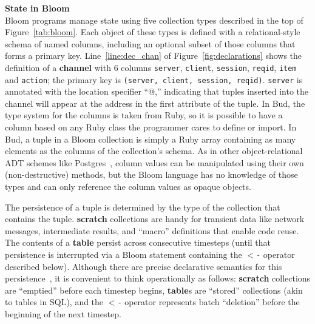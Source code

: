 \vspace{9pt}\noindent\textbf{State in Bloom}\\
Bloom programs manage state using five collection types described in
the top of Figure~\ref{tab:bloom}. Each object of these types is defined with a
relational-style schema of named columns, including an optional subset of those
columns that forms a primary key.  
Line~\ref{line:dec_chan} of
Figure~\ref{fig:declarations} shows the definition of a \textbf{channel} with 6
columns \texttt{server}, \texttt{client}, \texttt{session}, \texttt{reqid}, \texttt{item} and \texttt{action}; the
primary key is \texttt{(server, client, session, reqid)}. \texttt{server} is annotated with the location
specifier ``@,''
indicating that tuples inserted into the channel will appear at the address
in the first attribute of the tuple.
In Bud, the type system for the
columns is taken from Ruby, so it is possible to have a column based on any Ruby
class the programmer cares to define or import.  In Bud, a tuple in a Bloom
collection is simply a Ruby array containing as many elements as the columns of
the collection's schema.  As in other object-relational ADT schemes like
Postgres~\cite{postgres-adt}, column values can be manipulated using their own
(non-destructive) methods, but the Bloom language has no knowledge of those
types and can only reference the column values as opaque objects.

The persistence of a tuple is determined by the type of the collection that
contains the tuple. \textbf{scratch} collections are handy for transient data
like network messages, intermediate results, and ``macro'' definitions that
enable code reuse. The contents of a \textbf{table} persist across consecutive
timesteps (until that persistence is interrupted via a Bloom statement
containing the \texttt{$<$-} operator described below). Although there are
precise declarative semantics for this persistence~\cite{dedalus}, it is
convenient to think operationally as follows: \textbf{scratch} collections are
``emptied'' before each timestep begins, \textbf{table}s are ``stored''
collections (akin to tables in SQL), and the \texttt{$<$-} operator represents
batch ``deletion'' before the beginning of the next timestep.

